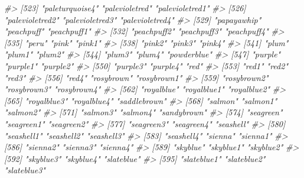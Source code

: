 \documentclass[
]{book}
\newenvironment{Shaded}{\begin{snugshade}}{\end{snugshade}}
\newcommand{\CommentTok}[1]{\textcolor[rgb]{0.56,0.35,0.01}{\textit{#1}}}
\begin{document}
\begin{Shaded}
\begin{Highlighting}[]
\CommentTok{\#\textgreater{} [523] "paleturquoise4"       "palevioletred"        "palevioletred1"      }
\CommentTok{\#\textgreater{} [526] "palevioletred2"       "palevioletred3"       "palevioletred4"      }
\CommentTok{\#\textgreater{} [529] "papayawhip"           "peachpuff"            "peachpuff1"          }
\CommentTok{\#\textgreater{} [532] "peachpuff2"           "peachpuff3"           "peachpuff4"          }
\CommentTok{\#\textgreater{} [535] "peru"                 "pink"                 "pink1"               }
\CommentTok{\#\textgreater{} [538] "pink2"                "pink3"                "pink4"               }
\CommentTok{\#\textgreater{} [541] "plum"                 "plum1"                "plum2"               }
\CommentTok{\#\textgreater{} [544] "plum3"                "plum4"                "powderblue"          }
\CommentTok{\#\textgreater{} [547] "purple"               "purple1"              "purple2"             }
\CommentTok{\#\textgreater{} [550] "purple3"              "purple4"              "red"                 }
\CommentTok{\#\textgreater{} [553] "red1"                 "red2"                 "red3"                }
\CommentTok{\#\textgreater{} [556] "red4"                 "rosybrown"            "rosybrown1"          }
\CommentTok{\#\textgreater{} [559] "rosybrown2"           "rosybrown3"           "rosybrown4"          }
\CommentTok{\#\textgreater{} [562] "royalblue"            "royalblue1"           "royalblue2"          }
\CommentTok{\#\textgreater{} [565] "royalblue3"           "royalblue4"           "saddlebrown"         }
\CommentTok{\#\textgreater{} [568] "salmon"               "salmon1"              "salmon2"             }
\CommentTok{\#\textgreater{} [571] "salmon3"              "salmon4"              "sandybrown"          }
\CommentTok{\#\textgreater{} [574] "seagreen"             "seagreen1"            "seagreen2"           }
\CommentTok{\#\textgreater{} [577] "seagreen3"            "seagreen4"            "seashell"            }
\CommentTok{\#\textgreater{} [580] "seashell1"            "seashell2"            "seashell3"           }
\CommentTok{\#\textgreater{} [583] "seashell4"            "sienna"               "sienna1"             }
\CommentTok{\#\textgreater{} [586] "sienna2"              "sienna3"              "sienna4"             }
\CommentTok{\#\textgreater{} [589] "skyblue"              "skyblue1"             "skyblue2"            }
\CommentTok{\#\textgreater{} [592] "skyblue3"             "skyblue4"             "slateblue"           }
\CommentTok{\#\textgreater{} [595] "slateblue1"           "slateblue2"           "slateblue3"          }

\end{Highlighting}
\end{Shaded}
\end{document}
